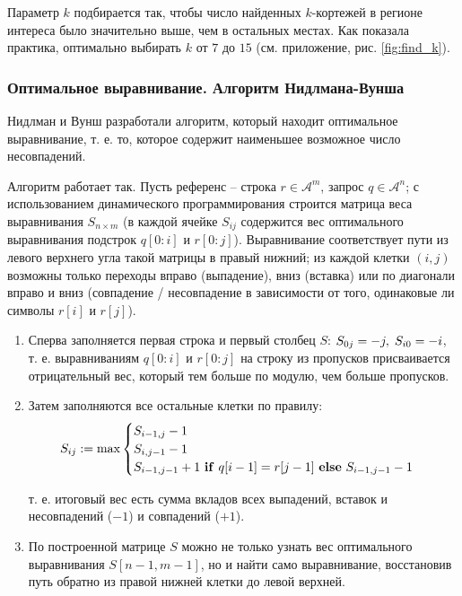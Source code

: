 \documentclass{main.tex}[subfiles]
\begin{document}
Параметр $k$ подбирается так, чтобы число найденных $k$-кортежей в регионе интереса было значительно выше, чем в остальных местах.
Как показала практика, оптимально выбирать $k$ от $7$ до $15$ (см. приложение, рис. \ref{fig:find_k}).

\subsubsection{Оптимальное выравнивание. Алгоритм Нидлмана-Вунша}

Нидлман и Вунш \cite{needleman1970} разработали алгоритм, который находит оптимальное выравнивание, т. е. то, которое содержит наименьшее возможное число несовпадений.

Алгоритм работает так.
Пусть референс -- строка $r \in \mathcal{A}^m $, запрос $q \in \mathcal{A}^n$; с использованием динамического программирования строится матрица веса выравнивания $S_{n\times m}$ (в каждой ячейке $S_{ij}$ содержится вес оптимального выравнивания подстрок $q[0:i]$ и $r[0:j]$). %
Выравнивание соответствует пути из левого верхнего угла такой матрицы в правый нижний; из каждой клетки $(i,j)$ возможны только переходы вправо (выпадение), вниз (вставка) или по диагонали вправо и вниз (совпадение / несовпадение в зависимости от того, одинаковые ли символы $r[i]$ и $r[j]$).
\begin{enumerate}
    \item Сперва заполняется первая строка и первый столбец $S$: $S_{0j} = -j, \thickspace S_{i0} = -i$, т. е. выравниваниям $q[0:i]$ и  $r[0:j]$ на строку из пропусков присваивается отрицательный вес, который тем больше по модулю, чем больше пропусков.
    \item Затем заполняются все остальные клетки по правилу:
    \[ S_{ij} := \max \begin{cases}
        S_{i-1,j} - 1 \\
        S_{i,j-1} - 1 \\
        S_{i-1,j-1} + 1 \text{ \textbf{if} } q[i-1] = r[j-1] \text{ \textbf{else} } S_{i-1,j-1} - 1
    \end{cases} \]

    т. е. итоговый вес есть сумма вкладов всех выпадений, вставок и несовпадений ($-1$) и совпадений ($+1$).
    \item По построенной матрице $ S $ можно не только узнать вес оптимального выравнивания $S[n-1,m-1]$, но и найти само выравнивание, восстановив путь обратно из правой нижней клетки до левой верхней.

\end{enumerate}
\end{document}
